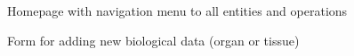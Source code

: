 \documentclass[11pt,a4paper]{article}
\begin{document}
\begin{figure}[H]
  \centering
  \caption{Homepage with navigation menu to all entities and operations}
  \label{fig:webapp-home}
\end{figure}

\begin{figure}[H]
  \centering
  \caption{Form for adding new biological data (organ or tissue)}
  \label{fig:webapp-add-bio}
\end{figure}
\end{document}
